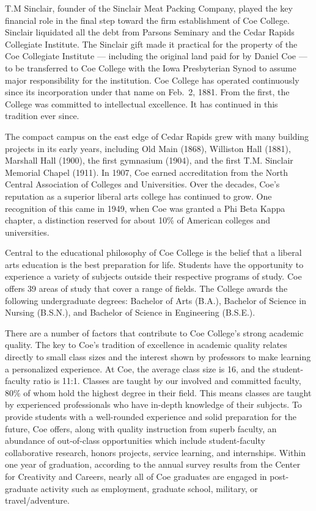\documentclass[
  letterpaper,
]{scrbook}
\begin{document}
T.M Sinclair, founder of the Sinclair Meat Packing Company, played the
key financial role in the final step toward the firm establishment of
Coe College. Sinclair liquidated all the debt from Parsons Seminary and
the Cedar Rapids Collegiate Institute. The Sinclair gift made it
practical for the property of the Coe Collegiate Institute --- including
the original land paid for by Daniel Coe --- to be transferred to Coe
College with the Iowa Presbyterian Synod to assume major responsibility
for the institution. Coe College has operated continuously since its
incorporation under that name on Feb.~2, 1881. From the first, the
College was committed to intellectual excellence. It has continued in
this tradition ever since.

The compact campus on the east edge of Cedar Rapids grew with many
building projects in its early years, including Old Main (1868),
Williston Hall (1881), Marshall Hall (1900), the first gymnasium (1904),
and the first T.M. Sinclair Memorial Chapel (1911). In 1907, Coe earned
accreditation from the North Central Association of Colleges and
Universities. Over the decades, Coe's reputation as a superior liberal
arts college has continued to grow. One recognition of this came in
1949, when Coe was granted a Phi Beta Kappa chapter, a distinction
reserved for about 10\% of American colleges and universities.

Central to the educational philosophy of Coe College is the belief that
a liberal arts education is the best preparation for life. Students have
the opportunity to experience a variety of subjects outside their
respective programs of study. Coe offers 39 areas of study that cover a
range of fields. The College awards the following undergraduate degrees:
Bachelor of Arts (B.A.), Bachelor of Science in Nursing (B.S.N.), and
Bachelor of Science in Engineering (B.S.E.).

There are a number of factors that contribute to Coe College's strong
academic quality. The key to Coe's tradition of excellence in academic
quality relates directly to small class sizes and the interest shown by
professors to make learning a personalized experience. At Coe, the
average class size is 16, and the student-faculty ratio is 11:1. Classes
are taught by our involved and committed faculty, 80\% of whom hold the
highest degree in their field. This means classes are taught by
experienced professionals who have in-depth knowledge of their subjects.
To provide students with a well-rounded experience and solid preparation
for the future, Coe offers, along with quality instruction from superb
faculty, an abundance of out-of-class opportunities which include
student-faculty collaborative research, honors projects, service
learning, and internships. Within one year of graduation, according to
the annual survey results from the Center for Creativity and Careers,
nearly all of Coe graduates are engaged in post-graduate activity such
as employment, graduate school, military, or travel/adventure. 
\end{document}
